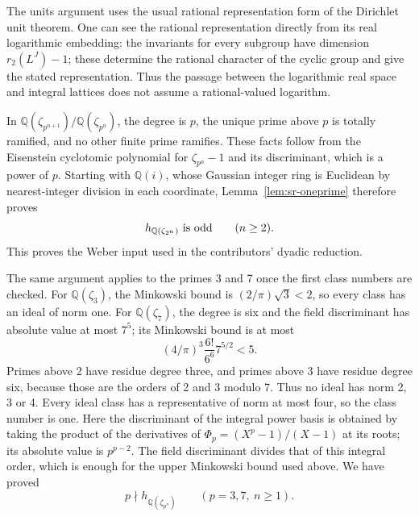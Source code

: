 The units argument uses the usual rational representation form of the
Dirichlet unit theorem. One can see the rational representation directly
from its real logarithmic embedding: the invariants for every subgroup
have dimension \(r_2(L^J)-1\); these determine the rational character
of the cyclic group and give the stated representation.
Thus the passage between the logarithmic real space and integral
lattices does not assume a rational-valued logarithm.

In \(\mathbb Q(\zeta_{p^{n+1}})/\mathbb Q(\zeta_{p^n})\), the degree
is \(p\), the unique prime above \(p\) is totally ramified, and no other
finite prime ramifies. These facts follow from the Eisenstein
cyclotomic polynomial for \(\zeta_{p^n}-1\) and its discriminant,
which is a power of \(p\).
Starting with \(\mathbb Q(i)\), whose Gaussian integer ring is Euclidean
by nearest-integer division in each coordinate, Lemma~\ref{lem:sr-oneprime}
therefore proves
\[
 h_{\mathbb Q(\zeta_{2^n})}\ \hbox{is odd}\qquad(n\geq2).
\]
This proves the Weber input used in the contributors' dyadic reduction.

The same argument applies to the primes 3 and 7 once the first class
numbers are checked. For \(\mathbb Q(\zeta_3)\), the Minkowski bound is
\((2/\pi)\sqrt3<2\), so every class has an ideal of norm one.
For \(\mathbb Q(\zeta_7)\), the degree is six and the field discriminant has
absolute value at most \(7^5\); its Minkowski bound is at most
\[
 (4/\pi)^3\frac{6!}{6^6}7^{5/2}<5.
\]
Primes above 2 have residue degree three, and primes above 3 have
residue degree six, because those are the orders of 2 and 3 modulo 7.
Thus no ideal has norm 2, 3 or 4.
Every ideal class has a representative of norm at most four, so the
class number is one.
Here the discriminant of the integral power basis is obtained by
taking the product of the derivatives of
\(\Phi_p=(X^p-1)/(X-1)\) at its roots; its absolute value is \(p^{p-2}\).
The field discriminant divides that of this integral order, which is
enough for the upper Minkowski bound used above.
We have proved
\[
 p\nmid h_{\mathbb Q(\zeta_{p^n})}
 \qquad(p=3,7,\ n\geq1).
\]

